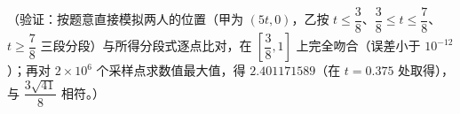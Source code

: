 \begin{answer}
（验证：按题意直接模拟两人的位置（甲为 \((5t,0)\)，乙按 \(t\leqslant\dfrac{3}{8}\)、\(\dfrac{3}{8}\leqslant t\leqslant\dfrac{7}{8}\)、\(t\geqslant\dfrac{7}{8}\) 三段分段）与所得分段式逐点比对，在 \(\left[\dfrac{3}{8},1\right]\) 上完全吻合（误差小于 \(10^{-12}\)）；再对 \(2\times10^{6}\) 个采样点求数值最大值，得 \(2.401171589\)（在 \(t=0.375\) 处取得），与 \(\dfrac{3\sqrt{41}}{8}\) 相符。）



\end{answer}
